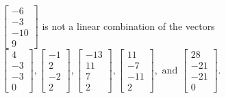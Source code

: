 \begin{exercise}
\begin{exerciseStatement}
  \end{exerciseStatement}
  \begin{exerciseAnswer}
   \(\left[\begin{array}{c}
-6 \\
-3 \\
-10 \\
9
\end{array}\right]\) 
  	 is not  
	a linear combination of the vectors \(\left[\begin{array}{c}
4 \\
-3 \\
-3 \\
0
\end{array}\right] , \left[\begin{array}{c}
-1 \\
2 \\
-2 \\
2
\end{array}\right] , \left[\begin{array}{c}
-13 \\
11 \\
7 \\
2
\end{array}\right] , \left[\begin{array}{c}
11 \\
-7 \\
-11 \\
2
\end{array}\right] , \text{ and } \left[\begin{array}{c}
28 \\
-21 \\
-21 \\
0
\end{array}\right]\).

	
  


  \end{exerciseAnswer}
\end{exercise}